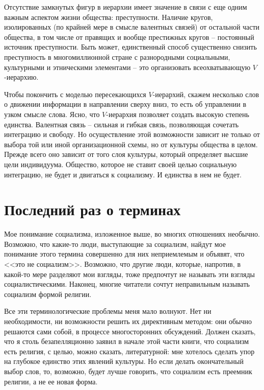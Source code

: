 \documentclass{book}
\begin{document}
Отсутствие замкнутых фигур в иерархии имеет значение в свя­зи с еще одним важным аспектом жизни общества: преступно­сти. Наличие кругов, изолированных (по крайней мере в смыс­ле валентных связей) от остальной части общества, в том числе от правящих и вообще престижных кругов -- постоянный источ­ник преступности. Быть может, единственный способ существен­но снизить преступность в многомиллионной стране с разнород­ными социальными, культурными и этническими элементами -- это организовать всеохватывающую $V$-иерархию.

Чтобы покончить с моделью пересекающихся $V$-иерархий, скажем несколько слов о движении информации в направлении сверху вниз, то есть об управлении в узком смысле слова. Ясно, что $V$-иерархия позволяет создать высокую степень единства. Валентная связь -- сильная и гибкая связь, позволяющая соче­тать интеграцию и свободу. Но осуществление этой возможности зависит не только от выбора той или иной организационной схемы, но от культуры общества в целом. Прежде всего оно зависит от того слоя культуры, который определяет высшие цели индивидуума. Общество, которое не ставит своей целью социальную интеграцию, не будет и двигаться к социализму. И единства в нем не будет.


\section{Последний раз о терминах}

Мое понимание социализма, изложенное выше, во многих отношениях необычно. Возможно, что какие-то люди, выступаю­щие за социализм, найдут мое понимание этого термина совер­шенно для них неприемлемым и объявят, что <<это не социализм>>. Возможно, что другие люди, которые, напротив, в какой-то ме­ре разделяют мои взгляды, тоже предпочтут не называть эти взгляды социалистическими. Наконец, многие читатели сочтут неправильным называть социализм формой религии.

Все эти терминологические проблемы меня мало волнуют. Нет ни необходимости, ни возможности решить их директивным методом: они обычно решаются сами собой, в процессе много­сторонних обсуждений. Должен сказать, что я столь безапелля­ционно заявил в начале этой части книги, что социализм есть религия, с целью, можно сказать, литературной: мне хотелось сделать упор на глубокое единство этих явлений культуры. Но если делать окончательный выбор слов, то, возможно, будет лучше говорить, что социализм есть преемник религии, а не ее новая форма.
\end{document}
